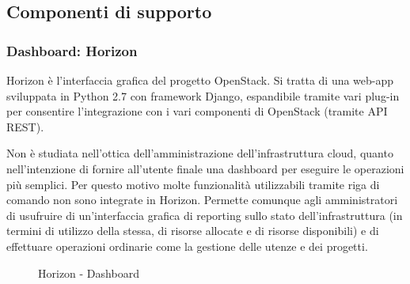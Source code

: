 \documentclass[../main.tex]{subfiles}
\begin{document}
\subsection{Componenti di supporto}
\subsubsection{Dashboard: Horizon}
Horizon è l'interfaccia grafica del progetto OpenStack.
Si tratta di una web-app sviluppata in Python 2.7 con framework Django, espandibile tramite vari plug-in per consentire l'integrazione con i vari componenti di OpenStack (tramite API REST).


Non è studiata nell'ottica dell'amministrazione dell'infrastruttura cloud, quanto nell'intenzione di fornire all'utente finale una dashboard per eseguire le operazioni più semplici. Per questo motivo molte funzionalità utilizzabili tramite riga di comando non sono integrate in Horizon.
Permette comunque agli amministratori di usufruire di un'interfaccia grafica di reporting sullo stato dell'infrastruttura (in termini di utilizzo della stessa, di risorse allocate e di risorse disponibili) e di effettuare operazioni ordinarie come la gestione delle utenze e dei progetti.
\begin{figure}[H]
\centering
{}
\caption{Horizon - Dashboard}\label{HorizonImg}
\end{figure}
\end{document}
